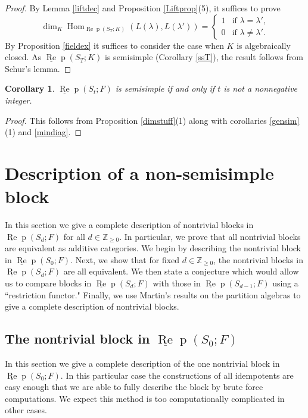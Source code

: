 \documentclass{amsart}
\newtheorem{corollary}[theorem]{Corollary}
\theoremstyle{definition}
\newcommand{\Hom}{\operatorname{Hom}}
\def\uRep{\underline{\operatorname{Re}}\!\operatorname{p}}
\renewcommand{\1}{_{(1)}}
\renewcommand{\2}{_{(2)}}
\newcommand{\3}{_{(3)}}
\newcommand{\4}{_{(4)}}
\newcommand{\Z}{\mathbb{Z}}
\begin{document}
\begin{proof} By Lemma \ref{liftdec} and Proposition \ref{Liftprop}(5), it suffices to prove $$\dim_K\Hom_{\uRep(S_T; K)}(L(\lambda), L(\lambda'))=\left\{\begin{array}{ll}
1& \text{if $\lambda=\lambda'$,}\\
0& \text{if $\lambda\not=\lambda'$.}
\end{array}\right.$$  By Proposition \ref{fieldex} it suffices to consider the case when $K$ is algebraically closed.  As $\uRep(S_T; K)$ is semisimple (Corollary \ref{ssT}), the result follows from Schur's lemma.
\end{proof}

\begin{corollary}\label{ss} $\uRep(S_t; F)$ is semisimple if and only if $t$ is not a nonnegative integer.
\end{corollary}

\begin{proof} This follows from Proposition \ref{dimstuff}(1) along with corollaries \ref{gensim}(1) and  \ref{mindiag}.
\end{proof}





\section{Description of a non-semisimple block} \label{blockquiver}

In this section we give a complete description of nontrivial blocks in $\uRep(S_d; F)$ for all $d\in\Z_{\geq0}$.  In particular, we prove that all nontrivial blocks are equivalent as additive categories.  We begin by describing the nontrivial block in $\uRep(S_0; F)$.  Next, we show that for fixed $d\in\Z_{\geq0}$, the nontrivial blocks in $\uRep(S_d; F)$ are all equivalent.  We then state a conjecture which would allow us to compare blocks in $\uRep(S_d; F)$ with those in $\uRep(S_{d-1}; F)$ using a ``restriction functor."  Finally, we use Martin's results on the partition algebras to give a complete description of nontrivial blocks.



\subsection{The nontrivial block in $\uRep(S_0; F)$}  In this section we give a complete description of the one nontrivial block in $\uRep(S_0; F)$.  In this particular case the constructions of all idempotents are easy enough that we are able to fully describe the block by brute force computations.  
We expect this method is too computationally complicated in other cases.
\end{document}
